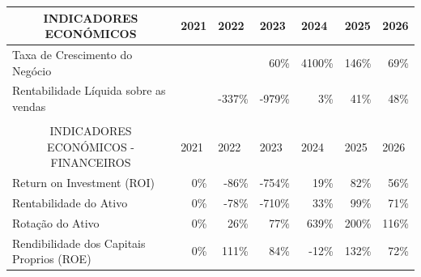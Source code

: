\documentclass[11pt]{article}
\begin{document}
	\begin{adjustbox}{center}
		\begin{tabular}{|l|r|r|r|r|r|r|}
			\hline
			\multicolumn{1}{|c|}{INDICADORES ECONÓMICOS}               & \multicolumn{1}{l|}{2021} & \multicolumn{1}{l|}{2022} & \multicolumn{1}{l|}{2023} & \multicolumn{1}{l|}{2024} & \multicolumn{1}{l|}{2025} & \multicolumn{1}{l|}{2026} \\ \hline
			Taxa de Crescimento do Negócio                             &                           &                           & 60\%                      & 4100\%                    & 146\%                     & 69\%                      \\ \hline
			Rentabilidade Líquida sobre as vendas                      &                           & -337\%                    & -979\%                    & 3\%                       & 41\%                      & 48\%                      \\ \hline
			&                           &                           &                           &                           &                           &                           \\ \hline
			\multicolumn{1}{|c|}{INDICADORES ECONÓMICOS - FINANCEIROS} & \multicolumn{1}{l|}{2021} & \multicolumn{1}{l|}{2022} & \multicolumn{1}{l|}{2023} & \multicolumn{1}{l|}{2024} & \multicolumn{1}{l|}{2025} & \multicolumn{1}{l|}{2026} \\ \hline
			Return on Investment (ROI)                                 & 0\%                       & -86\%                     & -754\%                    & 19\%                      & 82\%                      & 56\%                      \\ \hline
			Rentabilidade do Ativo                                     & 0\%                       & -78\%                     & -710\%                    & 33\%                      & 99\%                      & 71\%                      \\ \hline
			Rotação do Ativo                                           & 0\%                       & 26\%                      & 77\%                      & 639\%                     & 200\%                     & 116\%                     \\ \hline
			Rendibilidade dos Capitais Proprios (ROE)                  & 0\%                       & 111\%                     & 84\%                      & -12\%                     & 132\%                     & 72\%                      \\ \hline

\end{tabular}
\end{adjustbox}
\end{document}

